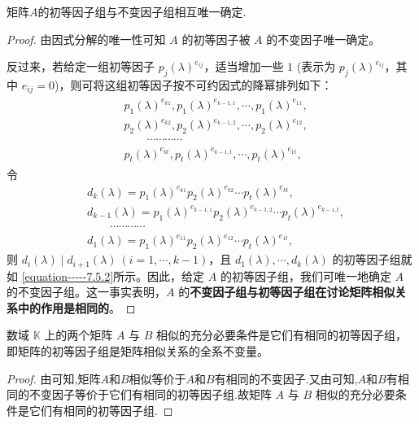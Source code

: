 \documentclass[../../main.tex]{subfiles}%
\begin{document}
\begin{proposition}\label{proposition:初等因子组与不变因子组相互唯一确定}
矩阵$A$的初等因子组与不变因子组相互唯一确定.
\end{proposition}
\begin{proof}

由因式分解的唯一性可知 $A$ 的初等因子被 $A$ 的不变因子唯一确定。

反过来，若给定一组初等因子 $p_j(\lambda)^{e_{ij}}$，适当增加一些 $1$ (表示为 $p_j(\lambda)^{e_{ij}}$，其中 $e_{ij}=0$)，则可将这组初等因子按不可约因式的降幂排列如下：
\begin{align}\label{equation-----7.5.2}
\begin{aligned}
&p_1(\lambda)^{e_{k1}},p_1(\lambda)^{e_{k - 1,1}},\cdots,p_1(\lambda)^{e_{11}},\\
&p_2(\lambda)^{e_{k2}},p_2(\lambda)^{e_{k - 1,2}},\cdots,p_2(\lambda)^{e_{12}},\\
&\quad \quad \cdots\cdots\cdots\cdots\\
&p_t(\lambda)^{e_{kt}},p_t(\lambda)^{e_{k - 1,t}},\cdots,p_t(\lambda)^{e_{1t}},
\end{aligned}
\end{align}
令
\begin{align*}
&d_k(\lambda)=p_1(\lambda)^{e_{k1}}p_2(\lambda)^{e_{k2}}\cdots p_t(\lambda)^{e_{kt}},\\
&d_{k - 1}(\lambda)=p_1(\lambda)^{e_{k - 1,1}}p_2(\lambda)^{e_{k - 1,2}}\cdots p_t(\lambda)^{e_{k - 1,t}},\\
&\quad \quad \cdots\cdots\cdots\cdots\\
&d_1(\lambda)=p_1(\lambda)^{e_{11}}p_2(\lambda)^{e_{12}}\cdots p_t(\lambda)^{e_{1t}},
\end{align*}
则 $d_i(\lambda)\mid d_{i + 1}(\lambda)\ (i = 1,\cdots,k - 1)$，且 $d_1(\lambda),\cdots,d_k(\lambda)$ 的初等因子组就如 \eqref{equation-----7.5.2}所示。因此，给定 $A$ 的初等因子组，我们可唯一地确定 $A$ 的不变因子组。这一事实表明，$A$ 的\textbf{不变因子组与初等因子组在讨论矩阵相似关系中的作用是相同的}。 
\end{proof}


\begin{theorem}\label{theorem:矩阵相似的充分必要条件是它们有相同的初等因子组}
数域 $\mathbb{K}$ 上的两个矩阵 $A$ 与 $B$ 相似的充分必要条件是它们有相同的初等因子组，即矩阵的初等因子组是矩阵相似关系的全系不变量。 
\end{theorem}
\begin{proof}
由可知,矩阵$A$和$B$相似等价于$A$和$B$有相同的不变因子.又由可知,$A$和$B$有相同的不变因子等价于它们有相同的初等因子组.故矩阵 $A$ 与 $B$ 相似的充分必要条件是它们有相同的初等因子组.
\end{proof}
\end{document}
